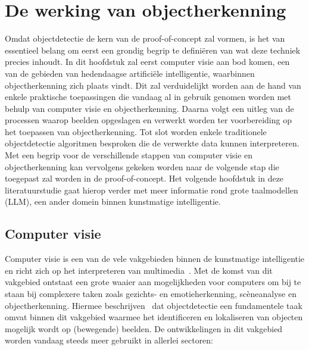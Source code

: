 \section{De werking van objectherkenning}\label{sec:ls-object-detectie}
Omdat objectdetectie de kern van de proof-of-concept zal vormen, is het van essentieel belang om eerst een grondig begrip te defini\"eren van wat deze techniek precies inhoudt.
In dit hoofdstuk zal eerst computer visie aan bod komen, een van de gebieden van hedendaagse artifici\"ele intelligentie, waarbinnen objectherkenning zich plaats vindt.
Dit zal verduidelijkt worden aan de hand van enkele praktische toepassingen die vandaag al in gebruik genomen worden met behulp van computer visie en objectherkenning.
Daarna volgt een uitleg van de processen waarop beelden opgeslagen en verwerkt worden ter voorbereiding op het toepassen van objectherkenning.
Tot slot worden enkele traditionele objectdetectie algoritmen besproken die de verwerkte data kunnen interpreteren.
Met een begrip voor de verschillende stappen van computer visie en objectherkenning kan vervolgens gekeken worden naar de volgende stap die toegepast zal worden in de proof-of-concept.
Het volgende hoofdstuk in deze literatuurstudie gaat hierop verder met meer informatie rond grote taalmodellen (LLM), een ander domein binnen kunstmatige intelligentie.

\subsection{Computer visie}\label{subsec:de-kern-van-objectdetectie}
Computer visie is een van de vele vakgebieden binnen de kunstmatige intelligentie en richt zich op het interpreteren van multimedia~\autocite{Moin2023}.
Met de komst van dit vakgebied ontstaat een grote waaier aan mogelijkheden voor computers om bij te staan bij complexere taken zoals gezichts- en emotieherkenning, sc\`eneanalyse en objectherkenning.
Hiermee beschrijven~\textcite{Tasnim2023} dat objectdetectie een fundamentele taak omvat binnen dit vakgebied waarmee het identificeren en lokaliseren van objecten mogelijk wordt op (bewegende) beelden.
De ontwikkelingen in dit vakgebied worden vandaag steeds meer gebruikt in allerlei sectoren:

